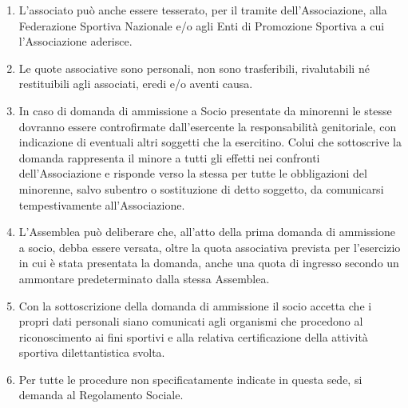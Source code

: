 \documentclass{djtsdoc}
\begin{document}
\begin{enumerate}
		\item L'associato può anche essere tesserato, per il tramite dell'Associazione, alla Federazione Sportiva Nazionale e/o agli Enti di Promozione Sportiva a cui l'Associazione aderisce.
		\item Le quote associative sono personali, non sono trasferibili, rivalutabili né restituibili agli associati, eredi e/o aventi causa.
		\item In caso di domanda di ammissione a Socio presentate da minorenni le stesse dovranno essere controfirmate dall'esercente la responsabilità genitoriale, con indicazione di eventuali altri soggetti che la esercitino. Colui che sottoscrive la domanda rappresenta il minore a tutti gli effetti nei confronti dell'Associazione e risponde verso la stessa per tutte le obbligazioni del minorenne, salvo subentro o sostituzione di detto soggetto, da comunicarsi tempestivamente all'Associazione.
		\item L'Assemblea può deliberare che, all'atto della prima domanda di ammissione a socio, debba essere versata, oltre la quota associativa prevista per l'esercizio in cui è stata presentata la domanda, anche una quota di ingresso secondo un ammontare predeterminato dalla stessa Assemblea.
		\item Con la sottoscrizione della domanda di ammissione il socio accetta che i propri dati personali siano comunicati agli organismi che procedono al riconoscimento ai fini sportivi e alla relativa certificazione della attività sportiva dilettantistica svolta.
		\item Per tutte le procedure non specificatamente indicate in questa sede, si demanda al Regolamento Sociale.
	\end{enumerate}
	
\end{document}
